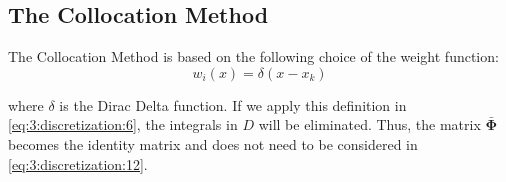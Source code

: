 		\subsection{The Collocation Method}\label{chap:methods:discretization:collocation}
		
			The Collocation Method is based on the following choice of the weight function:
			\begin{equation}
				w_i(x) = \delta(x-x_k) \label{eq:3:discretization:collocation:0}
			\end{equation}
		
			\noindent where $\delta$ is the Dirac Delta function. If we apply this definition in \eqref{eq:3:discretization:6}, the integrals in $D$ will be eliminated. Thus, the matrix $\boldsymbol{\bar{\Phi}}$ becomes the identity matrix and does not need to be considered in \eqref{eq:3:discretization:12}.
			
